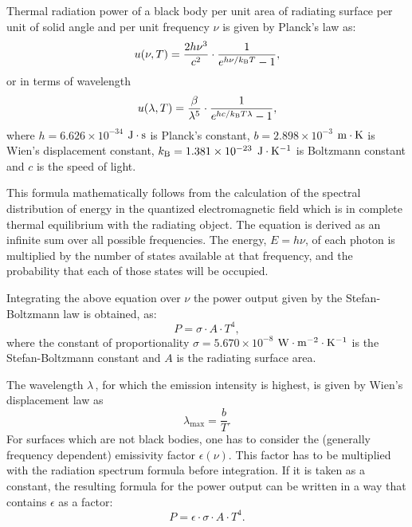 Thermal radiation power of a black body per unit area of radiating surface per unit of solid angle and per unit frequency $\nu$ is given by Planck's law as:
\begin{equation}
u(\nu,T)=\frac{2 h\nu^3}{c^2}\cdot\frac1{e^{h\nu/k_{\rm{B}}T}-1},
\end{equation}
or in terms of wavelength
\begin{equation}
u(\lambda,T)=\frac{\beta}{\lambda^5}\cdot\frac1{e^{hc/k_{\rm{B}}T\lambda}-1},
\end{equation}
where $h=6.626\times10^{-34}$ ${\rm{J}}\cdot {\rm{s}}$ is Planck's constant, $b=2.898\times10^{-3}$ ${\rm{m}} \cdot {\rm{K}}$ is Wien's displacement constant, $k_{\rm{B}}=1.381\times10^{-23}$ ${\rm{J}} \cdot {\rm{K}}^{-1}$ is Boltzmann constant and $c$ is the speed of light.

This formula mathematically follows from the calculation of the spectral distribution of energy in the quantized electromagnetic field which is in complete thermal equilibrium with the radiating object. The equation is derived as an infinite sum over all possible frequencies. The energy, $E=h \nu$, of each photon is multiplied by the number of states available at that frequency, and the probability that each of those states will be occupied.

Integrating the above equation over $\nu$ the power output given by the Stefan-Boltzmann law is obtained, as:
\begin{equation}
P = \sigma \cdot A \cdot T^4,
\label{Equ:IntegratingOfStefanBoltzmann}
\end{equation}
where the constant of proportionality $\sigma=5.670\times10^{-8}$ $\rm{W}\cdot \rm{m}^{-2}\cdot \rm{K}^{-1}$ is the Stefan-Boltzmann constant and $A$ is the radiating surface area.

The wavelength $\lambda \,$, for which the emission intensity is highest, is given by Wien's displacement law as
\begin{equation}
\lambda_{\max} = \frac{b}{T}.
\end{equation}
For surfaces which are not black bodies, one has to consider the (generally frequency dependent) emissivity factor $\epsilon(\nu)$. This factor has to be multiplied with the radiation spectrum formula before integration. If it is taken as a constant, the resulting formula for the power output can be written in a way that contains $\epsilon$ as a factor:
\begin{equation}
P = \epsilon \cdot \sigma \cdot A \cdot T^4.
\end{equation}

